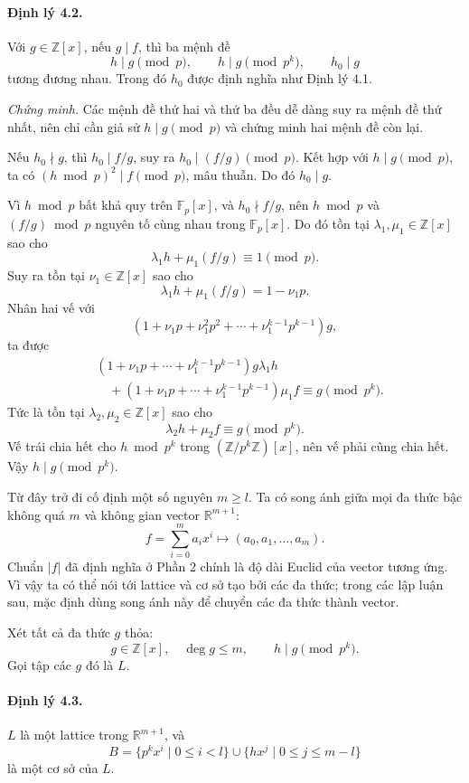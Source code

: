 \documentclass[11pt]{article}
\begin{document}
\paragraph{Định lý 4.2.}
Với \(g\in\mathbb Z[x]\), nếu \(g\mid f\), thì ba mệnh đề
\[
  h\mid g\pmod p,\qquad h\mid g\pmod {p^k},\qquad h_0\mid g
\]
tương đương nhau. Trong đó \(h_0\) được định nghĩa như Định lý 4.1.

\emph{Chứng minh.}
Các mệnh đề thứ hai và thứ ba đều dễ dàng suy ra mệnh đề thứ nhất, nên chỉ cần
giả sử \(h\mid g\pmod p\) và chứng minh hai mệnh đề còn lại.

Nếu \(h_0\nmid g\), thì \(h_0\mid f/g\), suy ra \(h_0\mid (f/g)\pmod p\).
Kết hợp với \(h\mid g\pmod p\), ta có \((h\bmod p)^2\mid f\pmod p\), mâu
thuẫn. Do đó \(h_0\mid g\).

Vì \(h\bmod p\) bất khả quy trên \(\mathbb F_p[x]\), và \(h_0\nmid f/g\), nên
\(h\bmod p\) và \((f/g)\bmod p\) nguyên tố cùng nhau trong \(\mathbb F_p[x]\).
Do đó tồn tại \(\lambda_1,\mu_1\in\mathbb Z[x]\) sao cho
\[
  \lambda_1h+\mu_1(f/g)\equiv 1\pmod p.
\]
Suy ra tồn tại \(\nu_1\in\mathbb Z[x]\) sao cho
\[
  \lambda_1h+\mu_1(f/g)=1-\nu_1p.
\]
Nhân hai vế với
\[
  (1+\nu_1p+\nu_1^2p^2+\cdots+\nu_1^{k-1}p^{k-1})g,
\]
ta được
\[
\begin{aligned}
&(1+\nu_1p+\cdots+\nu_1^{k-1}p^{k-1})g\lambda_1h\\
&\quad +(1+\nu_1p+\cdots+\nu_1^{k-1}p^{k-1})\mu_1f
 \equiv g \pmod {p^k}.
\end{aligned}
\]
Tức là tồn tại \(\lambda_2,\mu_2\in\mathbb Z[x]\) sao cho
\[
  \lambda_2h+\mu_2f\equiv g\pmod {p^k}.
\]
Vế trái chia hết cho \(h\bmod p^k\) trong \((\mathbb Z/p^k\mathbb Z)[x]\),
nên vế phải cũng chia hết. Vậy \(h\mid g\pmod {p^k}\).

Từ đây trở đi cố định một số nguyên \(m\ge l\). Ta có song ánh giữa mọi đa thức
bậc không quá \(m\) và không gian vector \(\mathbb R^{m+1}\):
\[
  f=\sum_{i=0}^{m}a_ix^i\longmapsto (a_0,a_1,\ldots,a_m).
\]
Chuẩn \(|f|\) đã định nghĩa ở Phần 2 chính là độ dài Euclid của vector tương
ứng. Vì vậy ta có thể nói tới lattice và cơ sở tạo bởi các đa thức; trong các
lập luận sau, mặc định dùng song ánh này để chuyển các đa thức thành vector.

Xét tất cả đa thức \(g\) thỏa:
\[
  g\in\mathbb Z[x],\quad \deg g\le m,\qquad h\mid g\pmod {p^k}.
\]
Gọi tập các \(g\) đó là \(L\).

\paragraph{Định lý 4.3.}
\(L\) là một lattice trong \(\mathbb R^{m+1}\), và
\[
  B=\{p^kx^i\mid 0\le i<l\}\cup \{hx^j\mid 0\le j\le m-l\}
\]
là một cơ sở của \(L\).
\end{document}
